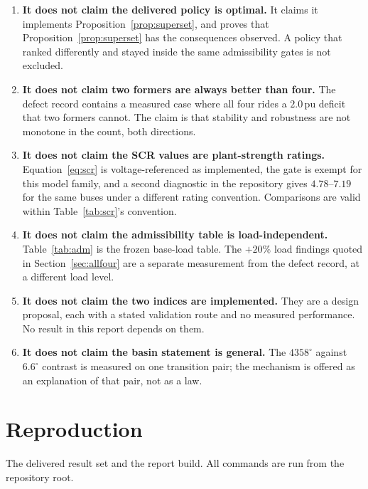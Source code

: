 \documentclass[12pt,a4paper]{article}
\theoremstyle{remark}
\newcommand{\pu}{\,\mathrm{pu}}
\begin{document}
\begin{enumerate}[leftmargin=1.6em,itemsep=2.5pt]
\item \textbf{It does not claim the delivered policy is optimal.} It claims it
      implements Proposition~\ref{prop:superset}, and proves that
      Proposition~\ref{prop:superset} has the consequences observed. A policy
      that ranked differently and stayed inside the same admissibility gates is
      not excluded.
\item \textbf{It does not claim two formers are always better than four.} The
      defect record contains a measured case where all four rides a
      $2.0\pu$ deficit that two formers cannot. The claim is that stability and
      robustness are not monotone in the count, both directions.
\item \textbf{It does not claim the SCR values are plant-strength ratings.}
      Equation~\eqref{eq:scr} is voltage-referenced as implemented, the gate is
      exempt for this model family, and a second diagnostic in the repository
      gives $4.78$--$7.19$ for the same buses under a different rating
      convention. Comparisons are valid within Table~\ref{tab:scr}'s convention.
\item \textbf{It does not claim the admissibility table is load-independent.}
      Table~\ref{tab:adm} is the frozen base-load table. The $+20\%$ load
      findings quoted in Section~\ref{sec:allfour} are a separate measurement
      from the defect record, at a different load level.
\item \textbf{It does not claim the two indices are implemented.} They are a
      design proposal, each with a stated validation route and no measured
      performance. No result in this report depends on them.
\item \textbf{It does not claim the basin statement is general.} The
      $4358^{\circ}$ against $6.6^{\circ}$ contrast is measured on one transition
      pair; the mechanism is offered as an explanation of that pair, not as a
      law.
\end{enumerate}

\section{Reproduction}\label{sec:repro}

The delivered result set and the report build. All commands are run from the
repository root.
\end{document}
